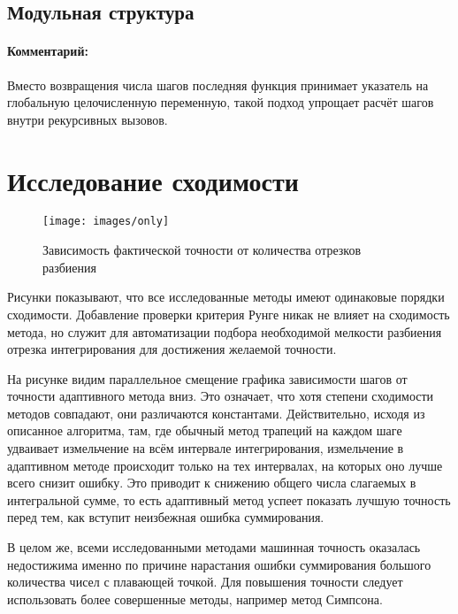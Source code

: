 \documentclass[a4paper, 14pt]{article}
\begin{document}
\subsection{Модульная структура}

\paragraph{Комментарий:} Вместо возвращения числа шагов последняя функция принимает указатель на глобальную целочисленную переменную, такой подход упрощает расчёт шагов внутри рекурсивных вызовов.

\section{Исследование сходимости}
\begin{figure}[H]
    \centering
    \caption{Зависимость фактической точности от количества отрезков разбиения}
    \texttt{[image: images/only]}
    \label{fig:1}
\end{figure}
Рисунки показывают, что все исследованные методы имеют одинаковые порядки сходимости. Добавление проверки критерия Рунге никак не влияет на сходимость метода, но служит для автоматизации подбора необходимой мелкости разбиения отрезка интегрирования для достижения желаемой точности.

На рисунке видим параллельное смещение графика зависимости шагов от точности адаптивного метода вниз. Это означает, что хотя степени сходимости методов совпадают, они различаются константами. Действительно, исходя из описанное алгоритма, там, где обычный метод трапеций на каждом шаге удваивает измельчение на всём интервале интегрирования, измельчение в адаптивном методе происходит только на тех интервалах, на которых оно лучше всего снизит ошибку. Это приводит к снижению общего числа слагаемых в интегральной сумме, то есть адаптивный метод успеет показать лучшую точность перед тем, как вступит неизбежная ошибка суммирования.

В целом же, всеми исследованными методами машинная точность оказалась недостижима именно по причине нарастания ошибки суммирования большого количества чисел с плавающей точкой. Для повышения точности следует использовать более совершенные методы, например метод Симпсона.
\end{document}
